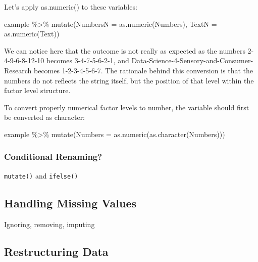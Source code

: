 \documentclass[
]{book}
\newenvironment{Shaded}{\begin{snugshade}}{\end{snugshade}}
\newcommand{\AttributeTok}[1]{\textcolor[rgb]{0.77,0.63,0.00}{#1}}
\newcommand{\FunctionTok}[1]{\textcolor[rgb]{0.00,0.00,0.00}{#1}}
\newcommand{\NormalTok}[1]{#1}
\newcommand{\SpecialCharTok}[1]{\textcolor[rgb]{0.00,0.00,0.00}{#1}}
\begin{document}
Let's apply as.numeric() to these variables:

\begin{Shaded}
\begin{Highlighting}[]
\NormalTok{example }\SpecialCharTok{\%\textgreater{}\%} 
  \FunctionTok{mutate}\NormalTok{(}\AttributeTok{NumbersN =} \FunctionTok{as.numeric}\NormalTok{(Numbers), }\AttributeTok{TextN =} \FunctionTok{as.numeric}\NormalTok{(Text))}
\end{Highlighting}
\end{Shaded}

We can notice here that the outcome is not really as expected as the numbers 2-4-9-6-8-12-10 becomes 3-4-7-5-6-2-1, and Data-Science-4-Sensory-and-Consumer-Research becomes 1-2-3-4-5-6-7. The rationale behind this conversion is that the numbers do not reflects the string itself, but the position of that level within the factor level structure.

To convert properly numerical factor levels to number, the variable should first be converted as character:

\begin{Shaded}
\begin{Highlighting}[]
\NormalTok{example }\SpecialCharTok{\%\textgreater{}\%}
  \FunctionTok{mutate}\NormalTok{(}\AttributeTok{Numbers =} \FunctionTok{as.numeric}\NormalTok{(}\FunctionTok{as.character}\NormalTok{(Numbers)))}
\end{Highlighting}
\end{Shaded}

\hypertarget{conditional-renaming}{%
\subsubsection{Conditional Renaming?}\label{conditional-renaming}}

\texttt{mutate()} and \texttt{ifelse()}

\hypertarget{handling-missing-values}{%
\subsection{Handling Missing Values}\label{handling-missing-values}}

Ignoring, removing, imputing

\hypertarget{restructuring-data}{%
\subsection{Restructuring Data}\label{restructuring-data}}
\end{document}
